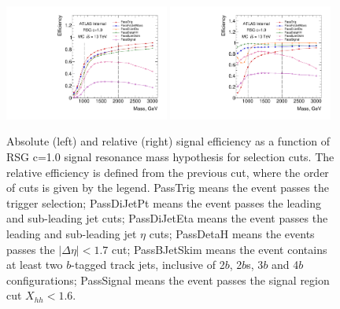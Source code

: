 \begin{figure}
\begin{center}
\includegraphics[angle=270, width=0.48\textwidth]{./figures/boosted/SigEff/evtsel_Moriond_Efficiency_PreSel.pdf}
\includegraphics[angle=270, width=0.48\textwidth]{./figures/boosted/SigEff/evtsel_Moriond_Efficiency_PreSel_rel.pdf}
  \caption{Absolute (left) and relative (right) signal efficiency as a function of RSG c=1.0 signal resonance mass hypothesis for selection cuts. The relative efficiency is defined from the previous cut, where the order of cuts is given by the legend. PassTrig means the event passes the trigger selection; PassDiJetPt means the event passes the leading and sub-leading jet \pt cuts; PassDiJetEta means the event passes the leading and sub-leading jet $\eta$ cuts; PassDetaH means the events passes the $|\Delta \eta| < 1.7$ cut; PassBJetSkim means the event contains at least two $b$-tagged track jets, inclusive of 2$b$, 2$b$s, 3$b$ and 4$b$ configurations; PassSignal means the event passes the signal region cut $X_{hh} < 1.6$.}
  \label{fig:boosted-selection-efficiency}
\end{center}
\end{figure}

